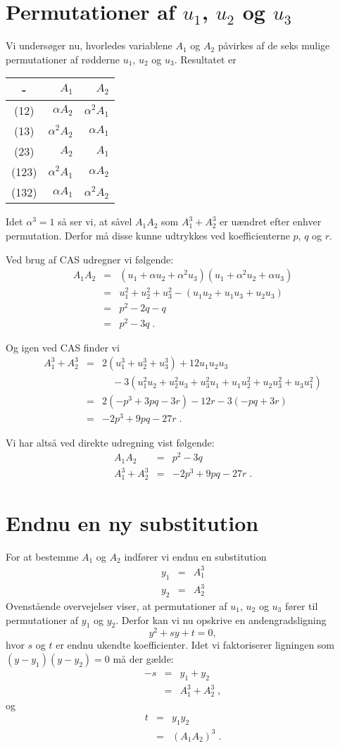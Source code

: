 \documentclass[12pt,oneside,a4paper]{article}
\newcommand{\bas}{\begin{eqnarray*}}
\newcommand{\eas}{\end{eqnarray*}}
\newcommand{\bea}{\begin{eqnarray}}
\newcommand{\eea}{\end{eqnarray}}
\begin{document}
\section{Permutationer af $u_1$, $u_2$ og $u_3$}
Vi undersøger nu, hvorledes variablene $A_1$ og $A_2$ påvirkes af de seks
mulige permutationer af rødderne $u_1$, $u_2$ og $u_3$. Resultatet er

\begin{tabular}{|c|r|r|}
    \hline 
    -    & $A_1$ & $ A_2$ \\
    \hline 
    (12) & $\alpha A_2$ & $\alpha^2 A_1$ \\
    (13) & $\alpha^2 A_2$ & $\alpha A_1$ \\
    (23) & $A_2$ & $A_1$ \\
    \hline 
    (123) & $\alpha^2 A_1$ & $\alpha A_2$ \\
    (132) & $\alpha A_1$ & $\alpha^2 A_2$ \\
    \hline
\end{tabular}

Idet $\alpha^3 = 1$ så ser vi, at såvel $A_1A_2$ som $A_1^3 + A_2^3$ er
uændret efter enhver permutation. Derfor må disse kunne udtrykkes 
ved koefficienterne $p$, $q$ og $r$.

Ved brug af CAS udregner vi følgende:
\bas
A_1 A_2 &=& (u_1+\alpha u_2 +\alpha^2 u_3)(u_1 +\alpha^2 u_2 + \alpha u_3) \\
&=& u_1^2 + u_2^2 + u_3^2 - (u_1u_2 + u_1u_3 + u_2u_3) \\
&=& p^2 - 2q - q \\
&=& p^2 - 3q \;.
\eas

Og igen ved CAS finder vi
\bas
A_1^3 + A_2^3 &=& 2(u_1^3 + u_2^3 + u_3^3) + 12 u_1u_2u_3 \\
&& \quad -3(u_1^2u_2 + u_2^2u_3 + u_3^2u_1 + u_1u_2^2 +u_2u_3^2 + u_3u_1^2) \\
&=& 2(-p^3+3pq-3r) - 12r - 3(-pq+3r) \\
&=& -2p^3 + 9pq - 27r \;.
\eas

Vi har altså ved direkte udregning vist følgende:
\bea
A_1A_2 &=& p^2 - 3q \label{eq_a1a2}\\
A_1^3 + A_2^3 &=& -2p^3 + 9pq - 27r \;.
\eea

\section{Endnu en ny substitution}
For at bestemme $A_1$ og $A_2$ indfører vi endnu en substitution
\bea
y_1 &=& A_1^3 \label{eq_y1}\\
y_2 &=& A_2^3 \label{eq_y2}
\eea
Ovenstående overvejelser viser, at permutationer af $u_1$, $u_2$ og $u_3$
fører til permutationer af $y_1$ og $y_2$. Derfor kan vi nu 
opskrive en andengradsligning
\begin{equation}
y^2 + sy + t = 0,
\label{eq_y}
\end{equation}
hvor $s$ og $t$ er endnu ukendte koefficienter.
Idet vi faktoriserer ligningen som $(y-y_1)(y-y_2) = 0$ må der gælde:
\bas
-s &=& y_1 + y_2 \\
&=& A_1^3 + A_2^3 \;,
\eas
og
\bas
t &=& y_1 y_2 \\
&=& (A_1 A_2)^3 \;.
\eas
\end{document}
